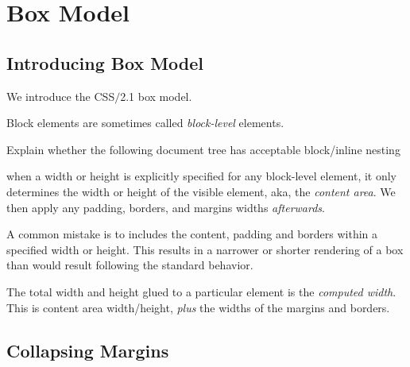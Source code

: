 \chapter{Box Model}

\section{Introducing Box Model}

We introduce the CSS$/$2.1 box model. 




Block elements are sometimes called \textit{block-level} elements.



\begin{example}
Explain whether the following document tree 
has acceptable block/inline nesting

\end{example}


when a width or height is explicitly specified for any block-level element, 
it only determines the width or height of the visible element, aka, the 
\textit{content area}. We then apply
any padding, borders, and margins widths \textit{afterwards}. 

A common mistake is to includes the content, 
padding and borders within a specified width or height.
This results in a narrower or shorter rendering of a box 
than would result following the standard behavior.

The total width and height glued to a particular 
element is the \textit{computed width}. 
This is content area width/height, \textit{plus} 
the widths of the margins and borders. 







\section{Collapsing Margins}




